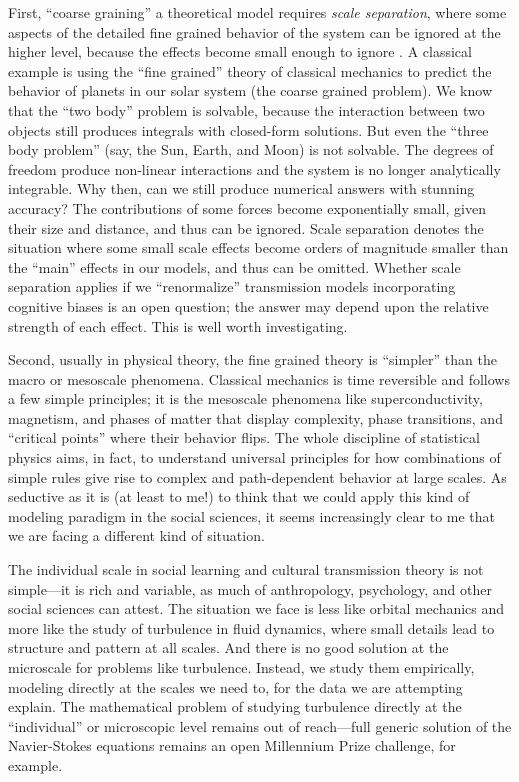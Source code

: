 First, ``coarse graining'' a theoretical model requires \emph{scale separation}, where some aspects of the detailed fine grained behavior of the system can be ignored at the higher level, because the effects become small enough to ignore \citep{hillerbrand2015explanation}.  A classical example is using the ``fine grained'' theory of classical mechanics to predict the behavior of planets in our solar system (the coarse grained problem). We know that the ``two body'' problem is solvable, because the interaction between two objects still produces integrals with closed-form solutions.  But even the ``three body problem'' (say, the Sun, Earth, and Moon) is not solvable.  The degrees of freedom produce non-linear interactions and the system is no longer analytically integrable.  Why then, can we still produce numerical answers with stunning accuracy?  The contributions of some forces become exponentially small, given their size and distance, and thus can be ignored.  Scale separation denotes the situation where some small scale effects become orders of magnitude smaller than the ``main'' effects in our models, and thus can be omitted.  Whether scale separation applies if we ``renormalize'' transmission models incorporating cognitive biases is an open question; the answer may depend upon the relative strength of each effect.  This is well worth investigating.

Second, usually in physical theory, the fine grained theory is ``simpler'' than the macro or mesoscale phenomena.  Classical mechanics is time reversible and follows a few simple principles; it is the mesoscale phenomena like superconductivity, magnetism, and phases of matter that display complexity, phase transitions, and ``critical points'' where their behavior flips.  The whole discipline of statistical physics aims, in fact, to understand universal principles for how combinations of simple rules give rise to complex and path-dependent behavior at large scales.  As seductive as it is (at least to me!) to think that we could apply this kind of modeling paradigm in the social sciences, it seems increasingly clear to me that we are facing a different kind of situation.  

The individual scale in social learning and cultural transmission theory is not simple---it is rich and variable, as much of anthropology, psychology, and other social sciences can attest.  The situation we face is less like orbital mechanics and more like the study of turbulence in fluid dynamics, where small details lead to structure and pattern at all scales.  And there is no good solution at the microscale for problems like turbulence.  Instead, we study them empirically, modeling directly at the scales we need to, for the data we are attempting explain.  The mathematical problem of studying turbulence directly at the ``individual'' or microscopic level remains out of reach---full generic solution of the Navier-Stokes equations remains an open Millennium Prize challenge, for example.

